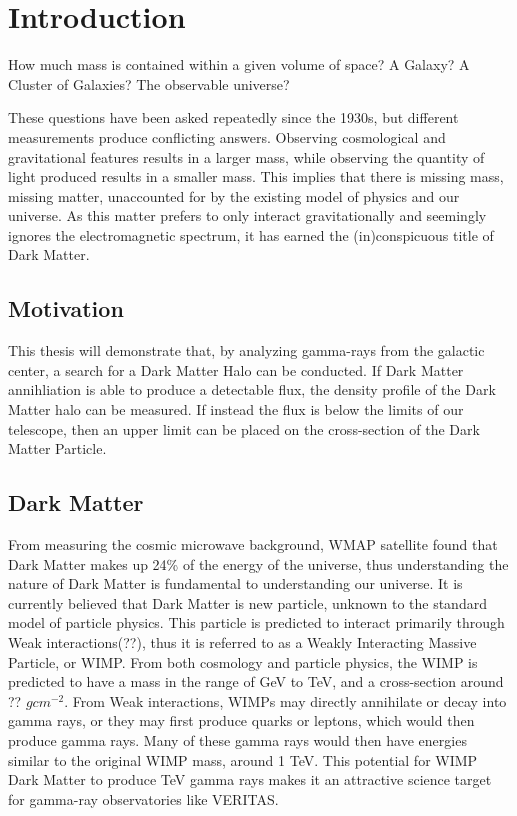 \cleartooddpage[\thispagestyle{empty}]
\chapter{Introduction}

How much mass is contained within a given volume of space?
A Galaxy?
A Cluster of Galaxies?
The observable universe?

These questions have been asked repeatedly since the 1930s, but different measurements produce conflicting answers.
Observing cosmological and gravitational features results in a larger mass, while observing the quantity of light produced results in a smaller mass.
This implies that there is missing mass, missing matter, unaccounted for by the existing model of physics and our universe.
As this matter prefers to only interact gravitationally and seemingly ignores the electromagnetic spectrum, it has earned the (in)conspicuous title of Dark Matter.

\section{Motivation}
This thesis will demonstrate that, by analyzing gamma-rays from the galactic center, a search for a Dark Matter Halo can be conducted.
If Dark Matter annihliation is able to produce a detectable flux, the density profile of the Dark Matter halo can be measured.
If instead the flux is below the limits of our telescope, then an upper limit can be placed on the cross-section of the Dark Matter Particle.

\section{Dark Matter}

From measuring the cosmic microwave background, WMAP satellite found that Dark Matter makes up 24\% of the energy of the universe\cite{pdg_2012}, thus understanding the nature of Dark Matter is fundamental to understanding our universe.
It is currently believed that Dark Matter is new particle, unknown to the standard model of particle physics.
This particle is predicted to interact primarily through Weak interactions(??), thus it is referred to as a Weakly Interacting Massive Particle, or WIMP.
From both cosmology and particle physics, the WIMP is predicted to have a mass in the range of GeV to TeV, and a cross-section around ?? $gcm^{-2}$.
From Weak interactions, WIMPs may directly annihilate or decay into gamma rays, or they may first produce quarks or leptons, which would then produce gamma rays.
Many of these gamma rays would then have energies similar to the original WIMP mass, around 1 TeV.
This potential for WIMP Dark Matter to produce TeV gamma rays makes it an attractive science target for gamma-ray observatories like VERITAS.


